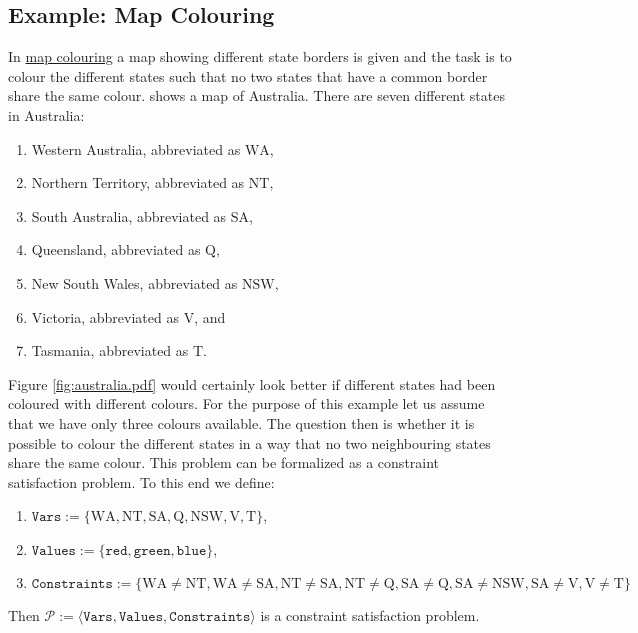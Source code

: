 \subsection{Example: Map Colouring}
In \href{https://en.wikipedia.org/wiki/Four_color_theorem}{map colouring} a map showing different state
borders is given and the task is to colour the different states such that no two states that have a common
border share the same colour.   shows a map of Australia.  There are seven different
states in Australia:
\begin{enumerate}
\item Western Australia, abbreviated as $\mathrm{WA}$,
\item Northern Territory, abbreviated as $\mathrm{NT}$,
\item South Australia, abbreviated as $\mathrm{SA}$,
\item Queensland, abbreviated as $\mathrm{Q}$,
\item New South Wales, abbreviated as $\mathrm{NSW}$,
\item Victoria, abbreviated as $\mathrm{V}$, and
\item Tasmania, abbreviated as $\mathrm{T}$.
\end{enumerate}
Figure \ref{fig:australia.pdf} would certainly look better if different states had been coloured with different
colours.  For the purpose of 
this example let us assume that we have only three colours available.  The question then is whether it is 
possible to colour the different states in a way that no two neighbouring states share the same colour.  This
problem can be formalized as a constraint satisfaction problem.  To this end we define:
\begin{enumerate}
\item $\mathtt{Vars} := \{ \mathrm{WA}, \mathrm{NT}, \mathrm{SA}, \mathrm{Q}, \mathrm{NSW}, \mathrm{V}, \mathrm{T} \}$,
\item $\mathtt{Values} := \{ \mathtt{red}, \mathtt{green}, \mathtt{blue} \}$,
\item $\mathtt{Constraints} := 
         \bigl\{ \mathrm{WA} \not= \mathrm{NT}, \mathrm{WA} \not= \mathrm{SA},
                 \mathrm{NT} \not= \mathrm{SA}, \mathrm{NT} \not= \mathrm{Q},
                 \mathrm{SA} \not= \mathrm{Q}, \mathrm{SA} \not= \mathrm{NSW}, \mathrm{SA} \not= \mathrm{V}, 
                 \mathrm{V} \not = \mathrm{T}
         \bigr\}
        $
\end{enumerate}
Then $\mathcal{P} := \langle \mathtt{Vars}, \mathtt{Values}, \mathtt{Constraints} \rangle$ is a constraint satisfaction problem.  
